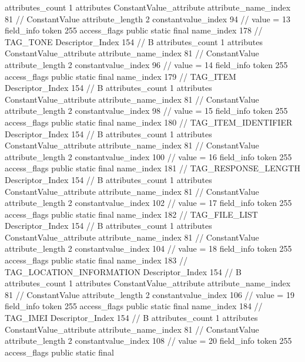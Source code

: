 {{{{{				attributes_count	1
				attributes {
				ConstantValue_attribute {
					attribute_name_index	81		// ConstantValue
					attribute_length	2
					constantvalue_index	94		// value = 13
				}
				}
			}
			field_info {
				token	255
				access_flags	public static final
				name_index	178		// TAG_TONE
				Descriptor_Index	154		// B
				attributes_count	1
				attributes {
				ConstantValue_attribute {
					attribute_name_index	81		// ConstantValue
					attribute_length	2
					constantvalue_index	96		// value = 14
				}
				}
			}
			field_info {
				token	255
				access_flags	public static final
				name_index	179		// TAG_ITEM
				Descriptor_Index	154		// B
				attributes_count	1
				attributes {
				ConstantValue_attribute {
					attribute_name_index	81		// ConstantValue
					attribute_length	2
					constantvalue_index	98		// value = 15
				}
				}
			}
			field_info {
				token	255
				access_flags	public static final
				name_index	180		// TAG_ITEM_IDENTIFIER
				Descriptor_Index	154		// B
				attributes_count	1
				attributes {
				ConstantValue_attribute {
					attribute_name_index	81		// ConstantValue
					attribute_length	2
					constantvalue_index	100		// value = 16
				}
				}
			}
			field_info {
				token	255
				access_flags	public static final
				name_index	181		// TAG_RESPONSE_LENGTH
				Descriptor_Index	154		// B
				attributes_count	1
				attributes {
				ConstantValue_attribute {
					attribute_name_index	81		// ConstantValue
					attribute_length	2
					constantvalue_index	102		// value = 17
				}
				}
			}
			field_info {
				token	255
				access_flags	public static final
				name_index	182		// TAG_FILE_LIST
				Descriptor_Index	154		// B
				attributes_count	1
				attributes {
				ConstantValue_attribute {
					attribute_name_index	81		// ConstantValue
					attribute_length	2
					constantvalue_index	104		// value = 18
				}
				}
			}
			field_info {
				token	255
				access_flags	public static final
				name_index	183		// TAG_LOCATION_INFORMATION
				Descriptor_Index	154		// B
				attributes_count	1
				attributes {
				ConstantValue_attribute {
					attribute_name_index	81		// ConstantValue
					attribute_length	2
					constantvalue_index	106		// value = 19
				}
				}
			}
			field_info {
				token	255
				access_flags	public static final
				name_index	184		// TAG_IMEI
				Descriptor_Index	154		// B
				attributes_count	1
				attributes {
				ConstantValue_attribute {
					attribute_name_index	81		// ConstantValue
					attribute_length	2
					constantvalue_index	108		// value = 20
				}
				}
			}
			field_info {
				token	255
				access_flags	public static final
}}}}}
